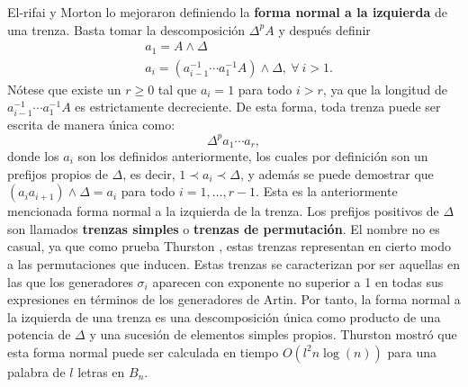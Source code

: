 \documentclass[bibtex, anon]{TEMat-article}
\begin{document}
El-rifai y Morton \cite{EM} lo mejoraron definiendo la \textbf{forma normal a la izquierda} de una trenza. Basta tomar la descomposición $\Delta^pA$ y después definir %
\begin{align*}
&a_1=A\land\Delta\\
&a_i=(a_{i-1}^{-1}\cdots a_1^{-1}A)\land\Delta,\ \forall\ i>1.
\end{align*}
Nótese que existe un $r\geq 0$ tal que $a_i=1$ para todo $i>r$, ya que la longitud de $a_{i-1}^{-1}\cdots a_1^{-1}A$ es estrictamente decreciente. De esta forma, toda trenza puede ser escrita de manera única como:
$$\Delta^p a_1\cdots a_r,$$
donde los $a_i$ son los definidos anteriormente, los cuales por definición son un prefijos propios de $\Delta$, es decir, $1\prec a_i\prec\Delta$, y además se puede demostrar que $(a_ia_{i+1})\land\Delta=a_i$ \cite{Thurston} para todo $i=1,\dots, r-1$. Esta es la anteriormente mencionada forma normal a la izquierda de la trenza. Los prefijos positivos de $\Delta$ son llamados \textbf{trenzas simples} o \textbf{trenzas de permutación}. El nombre no es casual, ya que como prueba Thurston \cite{Thurston}, estas trenzas representan en cierto modo a las permutaciones que inducen. Estas trenzas se caracterizan por ser aquellas en las que los generadores $\sigma_i$ aparecen con exponente no superior a 1 en todas sus expresiones en términos de los generadores de Artin. Por tanto, la forma normal a la izquierda de una trenza es una descomposición única como producto de una potencia de $\Delta$ y una sucesión de elementos simples propios. Thurston \cite{Thurston} mostró que esta forma normal puede ser calculada en tiempo $O(l^2n\log(n))$ para una palabra de $l$ letras en $B_n$. 

\end{document}
